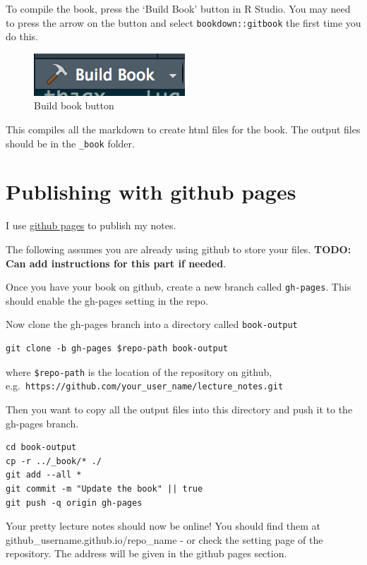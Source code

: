 \documentclass[
]{book}
\begin{document}
To compile the book, press the `Build Book' button in R Studio. You may need to press the arrow on the button and select \texttt{bookdown::gitbook} the first time you do this.

\begin{figure}
\includegraphics[width=0.5\linewidth]{Images/build-book} \caption{Build book button}\label{fig:build-book}
\end{figure}

This compiles all the markdown to create html files for the book. The output files should be in the \texttt{\_book} folder.

\section{Publishing with github pages}\label{sec:gh-pages}

I use \href{pages.github.com}{github pages} to publish my notes.

The following assumes you are already using github to store your files. \textbf{TODO: Can add instructions for this part if needed}.

Once you have your book on github, create a new branch called \texttt{gh-pages}. This should enable the gh-pages setting in the repo.

Now clone the gh-pages branch into a directory called \texttt{book-output}

\begin{verbatim}
git clone -b gh-pages $repo-path book-output
\end{verbatim}

where \texttt{\$repo-path} is the location of the repository on github, e.g.~\texttt{https://github.com/your\_user\_name/lecture\_notes.git}

Then you want to copy all the output files into this directory and push it to the gh-pages branch.

\begin{verbatim}
cd book-output
cp -r ../_book/* ./
git add --all *
git commit -m "Update the book" || true
git push -q origin gh-pages
\end{verbatim}

Your pretty lecture notes should now be online! You should find them at github\_username.github.io/repo\_name - or check the setting page of the repository. The address will be given in the github pages section.
\end{document}
